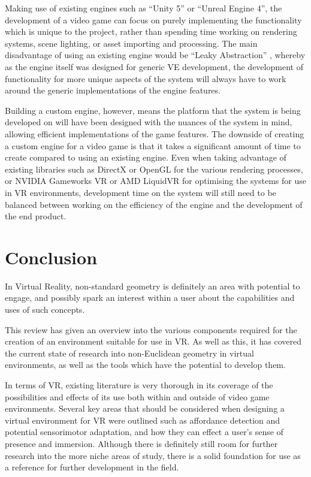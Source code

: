 		Making use of existing engines such as \enquote{Unity 5} or \enquote{Unreal Engine 4}, the development of a video game can focus on purely implementing the functionality which is unique to the project, rather than spending time working on rendering systems, scene lighting, or asset importing and processing.
		The main disadvantage of using an existing engine would be \enquote{Leaky Abstraction} \cite{Bruce2012}, whereby as the engine itself was designed for generic VE development, the development of functionality for more unique aspects of the system will always have to work around the generic implementations of the engine features.

		Building a custom engine, however, means the platform that the system is being developed on will have been designed with the nuances of the system in mind, allowing efficient implementations of the game features.
		The downside of creating a custom engine for a video game is that it takes a significant amount of time to create compared to using an existing engine.
		Even when taking advantage of existing libraries such as DirectX or OpenGL for the various rendering processes, or NVIDIA Gameworks VR or AMD LiquidVR for optimising the systems for use in VR environments, development time on the system will still need to be balanced between working on the efficiency of the engine and the development of the end product.


	\section{Conclusion}
	\label{lr:conclusion}

		In Virtual Reality, non-standard geometry is definitely an area with potential to engage, and possibly spark an interest within a user about the capabilities and uses of such concepts.

		This review has given an overview into the various components required for the creation of an environment suitable for use in VR.
		As well as this, it has covered the current state of research into non-Euclidean geometry in virtual environments, as well as the tools which have the potential to develop them.

		In terms of VR, existing literature is very thorough in its coverage of the possibilities and effects of its use both within and outside of video game environments.
		Several key areas that should be considered when designing a virtual environment for VR were outlined such as affordance detection and potential sensorimotor adaptation, and how they can effect a user's sense of presence and immersion.
		Although there is definitely still room for further research into the more niche areas of study, there is a solid foundation for use as a reference for further development in the field.

